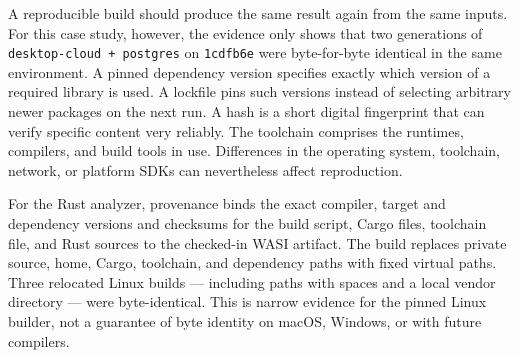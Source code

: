 \begin{beginnerstatement}

A reproducible build should produce the same result again from the same
inputs. For this case study, however, the evidence only shows that two
generations of \texttt{desktop-cloud + postgres} on \texttt{1cdfb6e} were
byte-for-byte identical in the same environment. A pinned dependency version
specifies exactly which version of a required library is used. A lockfile pins
such versions instead of selecting arbitrary newer packages on the next run. A
hash is a short digital fingerprint that can verify specific content very
reliably. The toolchain comprises the runtimes, compilers, and build tools in
use. Differences in the operating system, toolchain, network, or platform SDKs
can nevertheless affect reproduction.

For the Rust analyzer, provenance binds the exact compiler, target and
dependency versions and checksums for the build script, Cargo files, toolchain
file, and Rust sources to the checked-in WASI artifact. The build replaces
private source, home, Cargo, toolchain, and dependency paths with fixed virtual
paths. Three relocated Linux builds --- including paths with spaces and a local
vendor directory --- were byte-identical. This is narrow evidence for the
pinned Linux builder, not a guarantee of byte identity on macOS, Windows, or
with future compilers.

\end{beginnerstatement}

